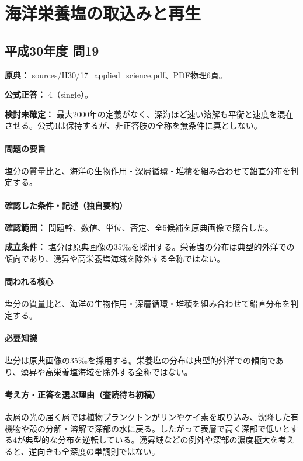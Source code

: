\section{海洋栄養塩の取込みと再生}

\subsection{平成30年度 問19}
\label{q:h30-reg-applied-19}

\noindent\textbf{原典：} sources/H30/17\_applied\_science.pdf、PDF物理6頁。

\textbf{公式正答：} 4（single）。

\par\textbf{検討未確定：} 最大2000年の定義がなく、深海ほど速い溶解も平衡と速度を混在させる。公式4は保持するが、非正答肢の全称を無条件に真としない。

\paragraph{問題の要旨} 塩分の質量比と、海洋の生物作用・深層循環・堆積を組み合わせて鉛直分布を判定する。

\paragraph{確認した条件・記述（独自要約）}\mbox{}\par

\noindent\textbf{確認範囲：} 問題幹、数値、単位、否定、全5候補を原典画像で照合した。\par

\noindent\textbf{成立条件：} 塩分は原典画像の35‰を採用する。栄養塩の分布は典型的外洋での傾向であり、湧昇や高栄養塩海域を除外する全称ではない。\par

\paragraph{問われる核心} 塩分の質量比と、海洋の生物作用・深層循環・堆積を組み合わせて鉛直分布を判定する。

\paragraph{必要知識} 塩分は原典画像の35‰を採用する。栄養塩の分布は典型的外洋での傾向であり、湧昇や高栄養塩海域を除外する全称ではない。

\paragraph{考え方・正答を選ぶ理由（査読待ち初稿）} 表層の光の届く層では植物プランクトンがリンやケイ素を取り込み、沈降した有機物や殻の分解・溶解で深部の水に戻る。したがって表層で高く深部で低いとする4が典型的な分布を逆転している。湧昇域などの例外や深部の濃度極大を考えると、逆向きも全深度の単調則ではない。

